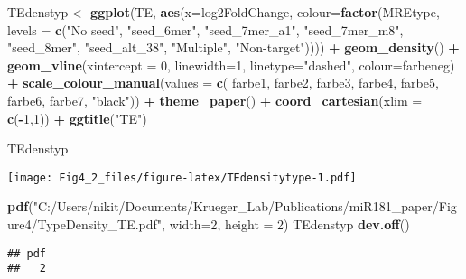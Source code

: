 \documentclass[
]{article}
\newenvironment{Shaded}{\begin{snugshade}}{\end{snugshade}}
\newcommand{\AttributeTok}[1]{\textcolor[rgb]{0.13,0.29,0.53}{#1}}
\newcommand{\DecValTok}[1]{\textcolor[rgb]{0.00,0.00,0.81}{#1}}
\newcommand{\FunctionTok}[1]{\textcolor[rgb]{0.13,0.29,0.53}{\textbf{#1}}}
\newcommand{\NormalTok}[1]{#1}
\newcommand{\OtherTok}[1]{\textcolor[rgb]{0.56,0.35,0.01}{#1}}
\newcommand{\SpecialCharTok}[1]{\textcolor[rgb]{0.81,0.36,0.00}{\textbf{#1}}}
\newcommand{\StringTok}[1]{\textcolor[rgb]{0.31,0.60,0.02}{#1}}
\begin{document}
\begin{Shaded}
\begin{Highlighting}[]
\NormalTok{TEdenstyp }\OtherTok{\textless{}{-}} \FunctionTok{ggplot}\NormalTok{(TE, }\FunctionTok{aes}\NormalTok{(}\AttributeTok{x=}\NormalTok{log2FoldChange, }\AttributeTok{colour=}\FunctionTok{factor}\NormalTok{(MREtype, }\AttributeTok{levels =} \FunctionTok{c}\NormalTok{(}\StringTok{"No seed"}\NormalTok{, }\StringTok{"seed\_6mer"}\NormalTok{, }\StringTok{"seed\_7mer\_a1"}\NormalTok{, }\StringTok{"seed\_7mer\_m8"}\NormalTok{, }\StringTok{"seed\_8mer"}\NormalTok{, }\StringTok{"seed\_alt\_38"}\NormalTok{, }\StringTok{"Multiple"}\NormalTok{, }\StringTok{"Non{-}target"}\NormalTok{)))) }\SpecialCharTok{+}
  \FunctionTok{geom\_density}\NormalTok{() }\SpecialCharTok{+}
  \FunctionTok{geom\_vline}\NormalTok{(}\AttributeTok{xintercept =} \DecValTok{0}\NormalTok{, }\AttributeTok{linewidth=}\DecValTok{1}\NormalTok{, }\AttributeTok{linetype=}\StringTok{"dashed"}\NormalTok{, }\AttributeTok{colour=}\NormalTok{farbeneg) }\SpecialCharTok{+}
  \FunctionTok{scale\_colour\_manual}\NormalTok{(}\AttributeTok{values =} \FunctionTok{c}\NormalTok{( farbe1, farbe2, farbe3, farbe4, farbe5, farbe6, farbe7, }\StringTok{"black"}\NormalTok{)) }\SpecialCharTok{+}
  \FunctionTok{theme\_paper}\NormalTok{() }\SpecialCharTok{+}
  \FunctionTok{coord\_cartesian}\NormalTok{(}\AttributeTok{xlim =} \FunctionTok{c}\NormalTok{(}\SpecialCharTok{{-}}\DecValTok{1}\NormalTok{,}\DecValTok{1}\NormalTok{)) }\SpecialCharTok{+}
  \FunctionTok{ggtitle}\NormalTok{(}\StringTok{"TE"}\NormalTok{)}

\NormalTok{TEdenstyp}
\end{Highlighting}
\end{Shaded}

\texttt{[image: Fig4\_2\_files/figure-latex/TEdensitytype-1.pdf]}

\begin{Shaded}
\begin{Highlighting}[]
\FunctionTok{pdf}\NormalTok{(}\StringTok{"C:/Users/nikit/Documents/Krueger\_Lab/Publications/miR181\_paper/Figure4/TypeDensity\_TE.pdf"}\NormalTok{, }\AttributeTok{width=}\DecValTok{2}\NormalTok{, }\AttributeTok{height =} \DecValTok{2}\NormalTok{)}
\NormalTok{TEdenstyp}
\FunctionTok{dev.off}\NormalTok{()}
\end{Highlighting}
\end{Shaded}

\begin{verbatim}
## pdf 
##   2
\end{verbatim}
\end{document}

